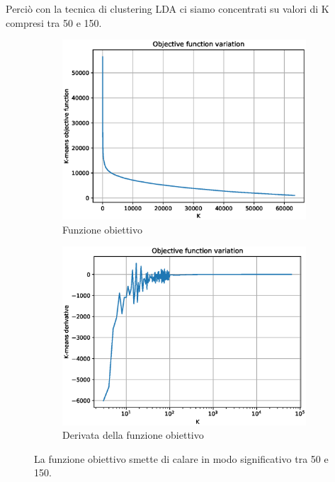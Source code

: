 \documentclass[
	12pt, %
	a4paper, %
	oneside, %
	headinclude,footinclude, %
	BCOR5mm, %
]{scrartcl}
\begin{document}
		Perciò con la tecnica di clustering LDA ci siamo concentrati su valori di K compresi tra 50 e 150.
		
		\begin{figure}[!htb]
			\hspace{-2cm}
			\begin{subfigure}{.5\textwidth}
				\centering
				\includegraphics[scale=.5]{../results/KMeans.eps}
				\caption{Funzione obiettivo}
			\end{subfigure}
			\hspace{1.5cm}
			\begin{subfigure}{.5\textwidth}
				\centering
				\includegraphics[scale=.5]{../results/KMeansDerivative.eps}
				\caption{Derivata della funzione obiettivo}
			\end{subfigure}
			\caption{La funzione obiettivo smette di calare in modo significativo tra 50 e 150.}
			\label{fig:KMeansObj}
		\end{figure}
\end{document}
